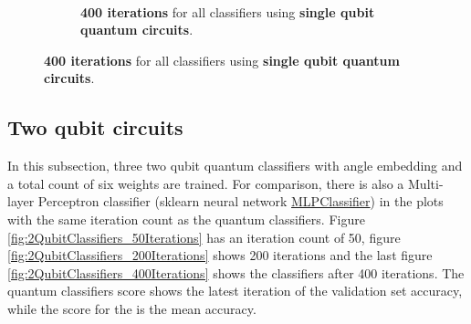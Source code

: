 \begin{figure}[h!]
\begin{subfigure}{1.0\textwidth}
    \end{subfigure}
    \\[1ex]
    \begin{subfigure}{1.0\textwidth}
        \centering
        \caption{\textbf{400 iterations} for all classifiers using \textbf{single qubit quantum circuits}.}
        \label{fig:SingleQubitClassifiers_400Iterations}
    \end{subfigure}
\end{figure}

\clearpage
\subsection{Two qubit circuits}
\label{subsection:two_qubit_circuits}
In this subsection, three two qubit quantum classifiers with angle embedding and a total count of six weights are trained. For comparison, there is also a Multi-layer Perceptron classifier (sklearn neural network \href{https://scikit-learn.org/stable/modules/generated/sklearn.neural_network.MLPClassifier.html}{MLPClassifier}) in the plots with the same iteration count as the quantum classifiers. Figure \ref{fig:2QubitClassifiers_50Iterations} has an iteration count of 50, figure \ref{fig:2QubitClassifiers_200Iterations} shows 200 iterations and the last figure \ref{fig:2QubitClassifiers_400Iterations} shows the classifiers after 400 iterations. The quantum classifiers score shows the latest iteration of the validation set accuracy, while the score for the  is the mean accuracy.\\
\\

